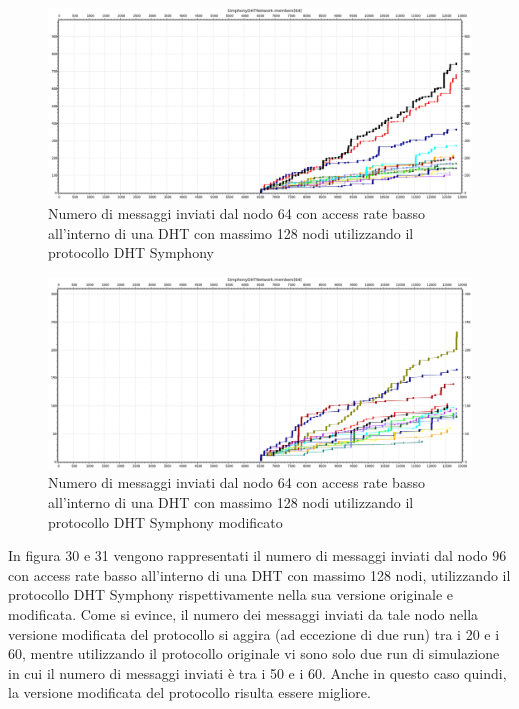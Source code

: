 \documentclass[	
	DIV=calc,
	paper=a4,
	fontsize=11pt,
	onecolumn
]{scrartcl} %
\begin{document}
	\begin{figure}[H]
		\centering
		\includegraphics[scale=0.35]	{SymphonyDHT/plots/MessagesSentByEveryNode/128_Nodes_SlowAccess/SymphonyDHT_128Nodes_SlowAccess_Node64.png}
		\caption{Numero di messaggi inviati dal nodo 64 con access rate basso all'interno di una DHT con massimo 128 nodi utilizzando il protocollo DHT Symphony}
		\label{Figura 28}
	\end{figure}
	\begin{figure}[H]
		\centering
		\includegraphics[scale=0.35]	{SymphonyDHTMod/plots/MessagesSentByEveryNode/128_Nodes_SlowAccess/SymphonyDHTMod_128Nodes_SlowAccess_Node64.png}
		\caption{Numero di messaggi inviati dal nodo 64 con access rate basso all'interno di una DHT con massimo 128 nodi utilizzando il protocollo DHT Symphony modificato}
		\label{Figura 29}
	\end{figure}	
	
	In figura 30 e 31 vengono rappresentati il numero di messaggi inviati dal nodo 96 con access rate basso all'interno di una DHT con massimo 128 nodi, utilizzando il protocollo DHT Symphony rispettivamente nella sua versione originale e modificata. Come si evince, il numero dei messaggi inviati da tale nodo nella versione modificata del protocollo si aggira (ad eccezione di due run) tra i 20 e i 60, mentre utilizzando il protocollo originale vi sono solo due run di simulazione in cui il numero di messaggi inviati è tra i 50 e i 60. Anche in questo caso quindi, la versione modificata del protocollo risulta essere migliore.
	
\end{document}
